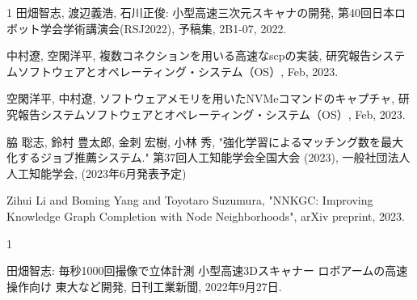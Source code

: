 \begin{発表}{1}
田畑智志, 渡辺義浩, 石川正俊: 小型高速三次元スキャナの開発, 第40回日本ロボット学会学術講演会(RSJ2022), 予稿集, 2B1-07, 2022.


中村遼, 空閑洋平, 複数コネクションを用いる高速なscpの実装, 研究報告システムソフトウェアとオペレーティング・システム（OS）, Feb, 2023.

空閑洋平, 中村遼, ソフトウェアメモリを用いたNVMeコマンドのキャプチャ, 研究報告システムソフトウェアとオペレーティング・システム（OS）, Feb, 2023.


脇 聡志, 鈴村 豊太郎, 金刺 宏樹, 小林 秀, "強化学習によるマッチング数を最大化するジョブ推薦システム." 第37回人工知能学会全国大会 (2023),  一般社団法人 人工知能学会, (2023年6月発表予定)


Zihui Li and Boming Yang and Toyotaro Suzumura, "NNKGC: Improving Knowledge Graph Completion with Node Neighborhoods", arXiv preprint, 2023.

\end{発表}


\begin{報道}{1}


田畑智志: 毎秒1000回撮像で立体計測 小型高速3Dスキャナー ロボアームの高速操作向け 東大など開発, 日刊工業新聞, 2022年9月27日.


\end{報道}
